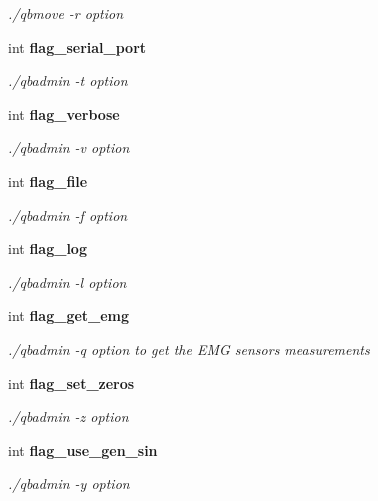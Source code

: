 \begin{DoxyCompactItemize}
\begin{DoxyCompactList}\small\item\em ./qbmove -\/r option \end{DoxyCompactList}\item 
\mbox{\label{structglobal__args_a5d91f73cfac19063f3b690444214cb11}} 
int \textbf{ flag\+\_\+serial\+\_\+port}
\begin{DoxyCompactList}\small\item\em ./qbadmin -\/t option \end{DoxyCompactList}\item 
\mbox{\label{structglobal__args_a2d410324c656ed3cf62239ef07f19df6}} 
int \textbf{ flag\+\_\+verbose}
\begin{DoxyCompactList}\small\item\em ./qbadmin -\/v option \end{DoxyCompactList}\item 
\mbox{\label{structglobal__args_afc413e6af53fa6f9942e91061ec9b1f7}} 
int \textbf{ flag\+\_\+file}
\begin{DoxyCompactList}\small\item\em ./qbadmin -\/f option \end{DoxyCompactList}\item 
\mbox{\label{structglobal__args_a86b9e5670875a9a7e17f30b62e988d89}} 
int \textbf{ flag\+\_\+log}
\begin{DoxyCompactList}\small\item\em ./qbadmin -\/l option \end{DoxyCompactList}\item 
\mbox{\label{structglobal__args_a1e27bdb894b1a7eb6221b1bd463dc71d}} 
int \textbf{ flag\+\_\+get\+\_\+emg}
\begin{DoxyCompactList}\small\item\em ./qbadmin -\/q option to get the E\+MG sensors measurements \end{DoxyCompactList}\item 
\mbox{\label{structglobal__args_a66d5c9e9750727f229d685d9399218d0}} 
int \textbf{ flag\+\_\+set\+\_\+zeros}
\begin{DoxyCompactList}\small\item\em ./qbadmin -\/z option \end{DoxyCompactList}\item 
\mbox{\label{structglobal__args_a976efe8621136ad8b129e72d53be6705}} 
int \textbf{ flag\+\_\+use\+\_\+gen\+\_\+sin}
\begin{DoxyCompactList}\small\item\em ./qbadmin -\/y option \end{DoxyCompactList}\item 

\end{DoxyCompactItemize}
